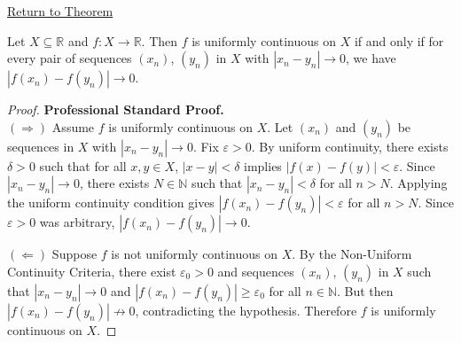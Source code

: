 \newpage
{}
\label{prf:sequential-uniform-continuity}

\begin{remark*}[Return]
\hyperref[prop:sequential-uniform-continuity]{Return to Theorem}
\end{remark*}

\begin{theorem*}
Let $X \subseteq \mathbb{R}$ and $f : X \to \mathbb{R}$.
Then $f$ is uniformly continuous on $X$ if and only if
for every pair of sequences $(x_n)$, $(y_n)$ in $X$ with
$|x_n - y_n| \to 0$, we have $|f(x_n) - f(y_n)| \to 0$.
\end{theorem*}

\begin{proof}
\textbf{Professional Standard Proof.}~\\
$(\Rightarrow)$ Assume $f$ is uniformly continuous on $X$. Let $(x_n)$ and $(y_n)$ be sequences in $X$ with $|x_n - y_n| \to 0$. Fix $\varepsilon > 0$. By uniform continuity, there exists $\delta > 0$ such that for all $x, y \in X$, $|x - y| < \delta$ implies $|f(x) - f(y)| < \varepsilon$. Since $|x_n - y_n| \to 0$, there exists $N \in \mathbb{N}$ such that $|x_n - y_n| < \delta$ for all $n > N$. Applying the uniform continuity condition gives $|f(x_n) - f(y_n)| < \varepsilon$ for all $n > N$. Since $\varepsilon > 0$ was arbitrary, $|f(x_n) - f(y_n)| \to 0$.

$(\Leftarrow)$ Suppose $f$ is not uniformly continuous on $X$. By the Non-Uniform Continuity Criteria, there exist $\varepsilon_0 > 0$ and sequences $(x_n)$, $(y_n)$ in $X$ such that $|x_n - y_n| \to 0$ and $|f(x_n) - f(y_n)| \geq \varepsilon_0$ for all $n \in \mathbb{N}$. But then $|f(x_n) - f(y_n)| \not\to 0$, contradicting the hypothesis. Therefore $f$ is uniformly continuous on $X$.
\end{proof}

